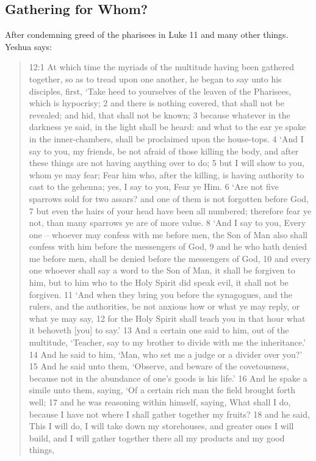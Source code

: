 \documentclass[11pt]{article}
\begin{document}
\subsection{Gathering for Whom? } \label{gathering for whom}
After condemning greed of the pharisees in Luke 11 and many other things. Yeshua says:
\begin{quote}
12:1 At which time the myriads of the multitude having been gathered together, so as to tread upon one another, he began to say unto his disciples, first, `Take heed to yourselves of the leaven of the Pharisees, which is hypocrisy;
2 and there is nothing covered, that shall not be revealed; and hid, that shall not be known;
3 because whatever in the darkness ye said, in the light shall be heard: and what to the ear ye spake in the inner-chambers, shall be proclaimed upon the house-tops.
4 `And I say to you, my friends, be not afraid of those killing the body, and after these things are not having anything over to do;
5 but I will show to you, whom ye may fear; Fear him who, after the killing, is having authority to cast to the gehenna; yes, I say to you, Fear ye Him.
6 `Are not five sparrows sold for two assars? and one of them is not forgotten before God,
7 but even the hairs of your head have been all numbered; therefore fear ye not, than many sparrows ye are of more value.
8 `And I say to you, Every one -- whoever may confess with me before men, the Son of Man also shall confess with him before the messengers of God,
9 and he who hath denied me before men, shall be denied before the messengers of God,
10 and every one whoever shall say a word to the Son of Man, it shall be forgiven to him, but to him who to the Holy Spirit did speak evil, it shall not be forgiven.
11 `And when they bring you before the synagogues, and the rulers, and the authorities, be not anxious how or what ye may reply, or what ye may say,
12 for the Holy Spirit shall teach you in that hour what it behoveth [you] to say.'
13 And a certain one said to him, out of the multitude, `Teacher, say to my brother to divide with me the inheritance.'
14 And he said to him, `Man, who set me a judge or a divider over you?'
15 And he said unto them, `Observe, and beware of the covetousness, because not in the abundance of one's goods is his life.'
16 And he spake a simile unto them, saying, `Of a certain rich man the field brought forth well;
17 and he was reasoning within himself, saying, What shall I do, because I have not where I shall gather together my fruits?
18 and he said, This I will do, I will take down my storehouses, and greater ones I will build, and I will gather together there all my products and my good things,

\end{quote}
\end{document}
